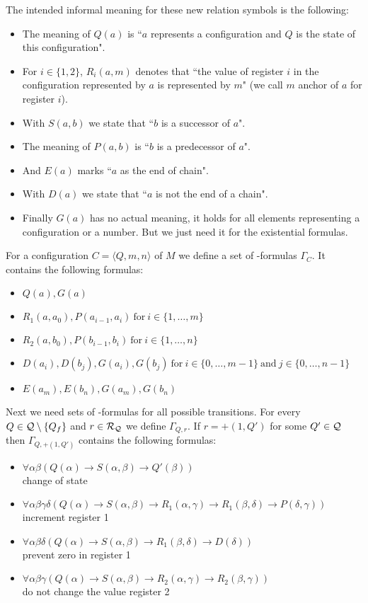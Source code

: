 The intended informal meaning for these new relation symbols is the following:
\begin{itemize}
	\item The meaning of $Q(a)$ is ``$a$ represents a configuration and $Q$ is the state of this configuration".
	\item  For $i\in\{1,2\}$, $R_i(a,m)$ denotes that ``the value of register $i$ in the configuration represented by $a$ is represented by $m$" (we call $m$ anchor of $a$ for register $i$).
	\item With $S(a,b)$ we state that ``$b$ is a successor of $a$".
	\item The meaning of $P(a,b)$ is ``$b$ is a predecessor of $a$".
	\item And $E(a)$ marks ``$a$ as the end of chain".
	\item With $D(a)$ we state that ``$a$ is not the end of a chain".
	\item Finally $G(a)$ has no actual meaning, it holds for all elements representing a configuration or a number. But we just need it for the existential formulas.
\end{itemize}
For a configuration $C=\langle Q,m,n\rangle$ of $M$ we define a set of \SysP-formulas $\Gamma_C$. It contains the following formulas:
\begin{itemize}
	\item $Q(a),G(a)$
	\item $R_1(a,a_0),P(a_{i-1},a_i)~\text{for}~i\in\{1,\dots,m\}$
	\item $R_2(a,b_0),P(b_{i-1},b_i)~\text{for}~i\in\{1,\dots,n\}$
	\item $D(a_i),D(b_j),G(a_i),G(b_j)~\text{for}~i\in\{0,\dots,m-1\}~\text{and}~j\in\{0,\dots,n-1\}$
	\item $E(a_m),E(b_n),G(a_m),G(b_n)$
\end{itemize}
Next we need sets of \SysP-formulas for all possible transitions.
For every $Q\in\mathcal{Q}\setminus\{Q_f\}$ and $r\in\mathcal{R}_{\mathcal{Q}}$ we define $\Gamma_{Q,r}$.
If $r=+(1,Q')$ for some $Q'\in\mathcal{Q}$ then $\Gamma_{Q,+(1,Q')}$ contains the following formulas:
\begin{itemize}
	\item $\forall\alpha\beta(Q(\alpha)\to S(\alpha,\beta)\to Q'(\beta))$ \\change of state
	\item $\forall\alpha\beta\gamma\delta(Q(\alpha)\to S(\alpha,\beta)\to R_1(\alpha,\gamma)\to R_1(\beta,\delta)\to P(\delta,\gamma))$\\increment register 1
	\item $\forall\alpha\beta\delta(Q(\alpha)\to S(\alpha,\beta)\to R_1(\beta,\delta)\to D(\delta))$ \\prevent zero in register 1
	\item $\forall\alpha\beta\gamma(Q(\alpha)\to S(\alpha,\beta)\to R_2(\alpha,\gamma)\to R_2(\beta,\gamma))$ \\do not change the value register 2
\end{itemize}

